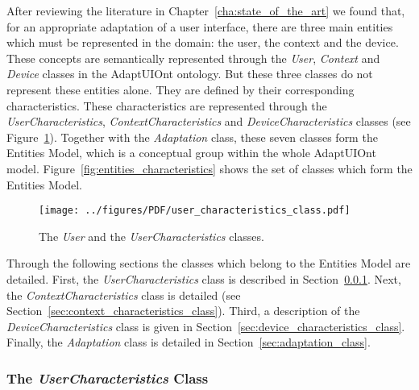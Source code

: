 After reviewing the literature in Chapter~\ref{cha:state_of_the_art} we found
that, for an appropriate adaptation of a user interface, there are three main
entities which must be represented in the domain: the user, the context and the
device. These concepts are semantically represented through the \textit{User},
\textit{Context} and \textit{Device} classes in the AdaptUIOnt ontology. But 
these three classes do not represent these entities alone. They are defined by 
their corresponding characteristics. These characteristics are represented through 
the \textit{UserCharacteristics}, \textit{ContextCharacteristics} and
\textit{DeviceCharacteristics} classes (see Figure~\ref{fig:user_characteristics_class}).
Together with the \textit{Adaptation} class, these seven classes form the Entities
Model, which is a conceptual group within the whole AdaptUIOnt model.
Figure~\ref{fig:entities_characteristics} shows the set of classes which form
the Entities Model.

\begin{figure}[H]
\centering
\texttt{[image: ../figures/PDF/user\_characteristics\_class.pdf]}
\caption{The \textit{User} and the \textit{UserCharacteristics} classes.}
\label{fig:user_characteristics_class}
\end{figure}

Through the following sections the classes which belong to the Entities Model
are detailed. First, the \textit{UserCharacteristics} class is described in
Section~\ref{sec:user_characteristics_class}. Next, the \textit{ContextCharacteristics}
class is detailed (see Section~\ref{sec:context_characteristics_class}). Third,
a description of the \textit{DeviceCharacteristics} class is given in
Section~\ref{sec:device_characteristics_class}. Finally, the \textit{Adaptation}
class is detailed in Section~\ref{sec:adaptation_class}.


\subsubsection{The \textit{UserCharacteristics} Class}
\label{sec:user_characteristics_class}

